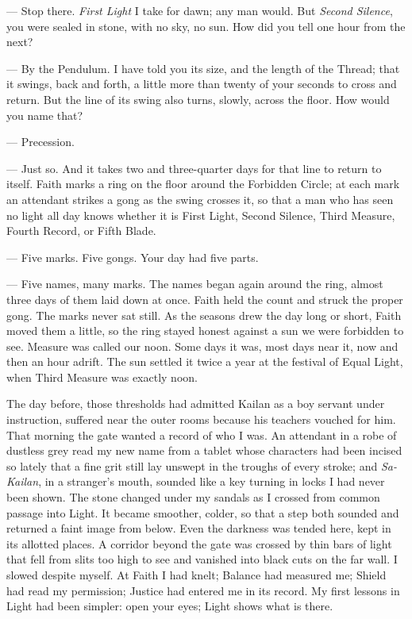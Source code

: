 \begin{room}

--- Stop there. \textit{First Light} I take for dawn; any man would. But \textit{Second Silence}, you were sealed in stone, with no sky, no sun. How did you tell one hour from the next?

--- By the Pendulum. I have told you its size, and the length of the Thread; that it swings, back and forth, a little more than twenty of your seconds to cross and return. But the line of its swing also turns, slowly, across the floor. How would you name that?

--- Precession.

--- Just so. And it takes two and three-quarter days for that line to return to itself. Faith marks a ring on the floor around the Forbidden Circle; at each mark an attendant strikes a gong as the swing crosses it, so that a man who has seen no light all day knows whether it is First Light, Second Silence, Third Measure, Fourth Record, or Fifth Blade.

--- Five marks. Five gongs. Your day had five parts.

--- Five names, many marks. The names began again around the ring, almost three days of them laid down at once. Faith held the count and struck the proper gong. The marks never sat still. As the seasons drew the day long or short, Faith moved them a little, so the ring stayed honest against a sun we were forbidden to see. Measure was called our noon. Some days it was, most days near it, now and then an hour adrift. The sun settled it twice a year at the festival of Equal Light, when Third Measure was exactly noon.

\end{room}

The day before, those thresholds had admitted Kailan as a boy servant under instruction, suffered near the outer rooms because his teachers vouched for him. That morning the gate wanted a record of who I was. An attendant in a robe of dustless grey read my new name from a tablet whose characters had been incised so lately that a fine grit still lay unswept in the troughs of every stroke; and \textit{Sa-Kailan}, in a stranger's mouth, sounded like a key turning in locks I had never been shown. The stone changed under my sandals as I crossed from common passage into Light. It became smoother, colder, so that a step both sounded and returned a faint image from below. Even the darkness was tended here, kept in its allotted places. A corridor beyond the gate was crossed by thin bars of light that fell from slits too high to see and vanished into black cuts on the far wall. I slowed despite myself. At Faith I had knelt; Balance had measured me; Shield had read my permission; Justice had entered me in its record. My first lessons in Light had been simpler: open your eyes; Light shows what is there.

